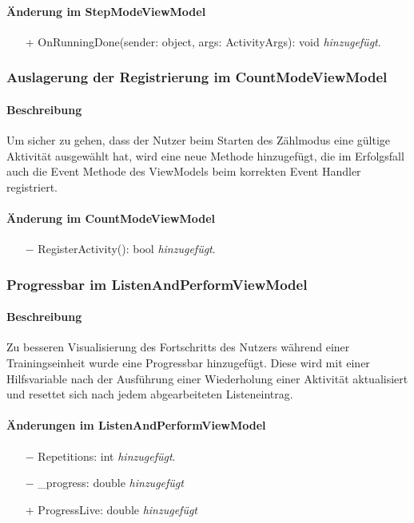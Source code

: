 \documentclass[a4paper,12pt]{article}
\begin{document}
\paragraph{Änderung im StepModeViewModel}
\begin{itemize}
	\item[+]  OnRunningDone(sender: object, args: ActivityArgs): void \textit{hinzugefügt}.
\end{itemize}

\subsubsection{Auslagerung der Registrierung im CountModeViewModel}
\paragraph{Beschreibung}
Um sicher zu gehen, dass der Nutzer beim Starten des Zählmodus eine gültige Aktivität ausgewählt hat, wird eine neue Methode hinzugefügt, die im Erfolgsfall auch die Event Methode des ViewModels beim korrekten Event Handler registriert.
\paragraph{Änderung im CountModeViewModel}
\begin{itemize}
	\item[$-$]  RegisterActivity(): bool \textit{hinzugefügt}.
\end{itemize}

\subsubsection{Progressbar im ListenAndPerformViewModel}
\paragraph{Beschreibung}
Zu besseren Visualisierung des Fortschritts des Nutzers während einer Trainingseinheit wurde eine Progressbar hinzugefügt. Diese wird mit einer Hilfsvariable nach der Ausführung einer Wiederholung einer Aktivität aktualisiert und resettet sich nach jedem abgearbeiteten Listeneintrag.
\paragraph{Änderungen im ListenAndPerformViewModel }
\begin{itemize}
	\item[$-$] Repetitions: int \textit{hinzugefügt}.
	\item[$-$] \_progress: double \textit{hinzugefügt}
	\item[+] ProgressLive: double \textit{hinzugefügt}
\end{itemize}
\end{document}
